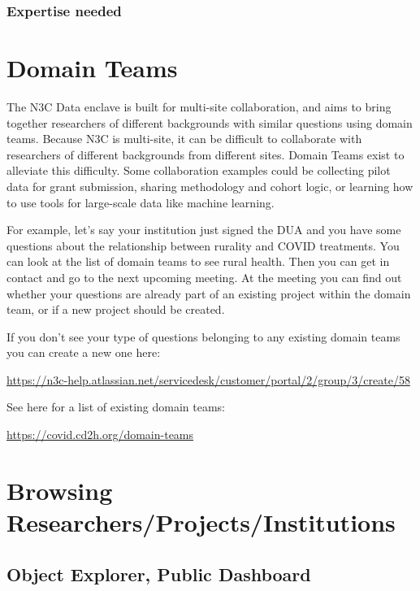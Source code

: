 \documentclass[
  letterpaper,
  DIV=11,
  numbers=noendperiod]{scrreprt}
\begin{document}
\hypertarget{expertise-needed}{%
\subsubsection{Expertise needed}\label{expertise-needed}}

\hypertarget{domain-teams}{%
\section{Domain Teams}\label{domain-teams}}

The N3C Data enclave is built for multi-site collaboration, and aims to
bring together researchers of different backgrounds with similar
questions using domain teams. Because N3C is multi-site, it can be
difficult to collaborate with researchers of different backgrounds from
different sites. Domain Teams exist to alleviate this difficulty. Some
collaboration examples could be collecting pilot data for grant
submission, sharing methodology and cohort logic, or learning how to use
tools for large-scale data like machine learning.

For example, let's say your institution just signed the DUA and you have
some questions about the relationship between rurality and COVID
treatments. You can look at the list of domain teams to see rural
health. Then you can get in contact and go to the next upcoming meeting.
At the meeting you can find out whether your questions are already part
of an existing project within the domain team, or if a new project
should be created.

If you don't see your type of questions belonging to any existing domain
teams you can create a new one here:

\url{https://n3c-help.atlassian.net/servicedesk/customer/portal/2/group/3/create/58}

See here for a list of existing domain teams:

\url{https://covid.cd2h.org/domain-teams}

\hypertarget{browsing-researchersprojectsinstitutions}{%
\section{Browsing
Researchers/Projects/Institutions}\label{browsing-researchersprojectsinstitutions}}

\hypertarget{object-explorer-public-dashboard}{%
\subsection{Object Explorer, Public
Dashboard}\label{object-explorer-public-dashboard}}
\end{document}
